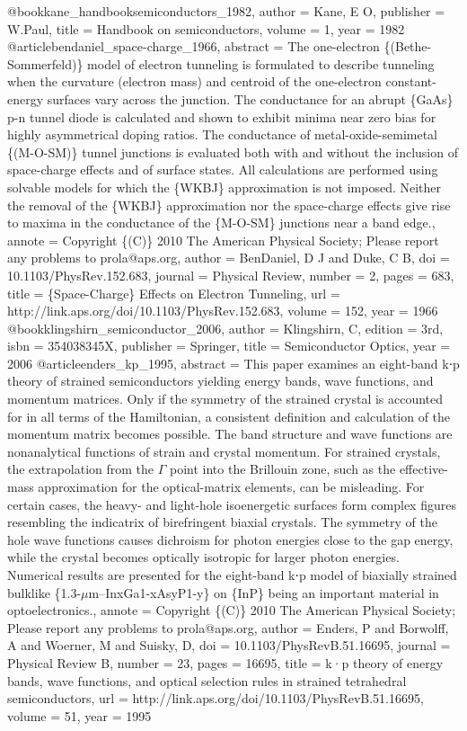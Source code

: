 @book{kane_handbooksemiconductors_1982,
author = {Kane, E O},
publisher = {W.Paul},
title = {{Handbook on semiconductors}},
volume = {1},
year = {1982}
}
@article{bendaniel_space-charge_1966,
abstract = {The one-electron \{(Bethe-Sommerfeld)\} model of electron tunneling is formulated to describe tunneling when the curvature (electron mass) and centroid of the one-electron constant-energy surfaces vary across the junction. The conductance for an abrupt \{GaAs\} p-n tunnel diode is calculated and shown to exhibit minima near zero bias for highly asymmetrical doping ratios. The conductance of metal-oxide-semimetal \{(M-O-SM)\} tunnel junctions is evaluated both with and without the inclusion of space-charge effects and of surface states. All calculations are performed using solvable models for which the \{WKBJ\} approximation is not imposed. Neither the removal of the \{WKBJ\} approximation nor the space-charge effects give rise to maxima in the conductance of the \{M-O-SM\} junctions near a band edge.},
annote = {Copyright \{(C)\} 2010 The American Physical Society; Please report any problems to prola@aps.org},
author = {BenDaniel, D J and Duke, C B},
doi = {10.1103/PhysRev.152.683},
journal = {Physical Review},
number = {2},
pages = {683},
title = {{\{Space-Charge\} Effects on Electron Tunneling}},
url = {http://link.aps.org/doi/10.1103/PhysRev.152.683},
volume = {152},
year = {1966}
}
@book{klingshirn_semiconductor_2006,
author = {Klingshirn, C},
edition = {3rd},
isbn = {354038345X},
publisher = {Springer},
title = {{Semiconductor Optics}},
year = {2006}
}
@article{enders_kp_1995,
abstract = {This paper examines an eight-band k⋅p theory of strained semiconductors yielding energy bands, wave functions, and momentum matrices. Only if the symmetry of the strained crystal is accounted for in all terms of the Hamiltonian, a consistent definition and calculation of the momentum matrix becomes possible. The band structure and wave functions are nonanalytical functions of strain and crystal momentum. For strained crystals, the extrapolation from the $\Gamma$ point into the Brillouin zone, such as the effective-mass approximation for the optical-matrix elements, can be misleading. For certain cases, the heavy- and light-hole isoenergetic surfaces form complex figures resembling the indicatrix of birefringent biaxial crystals. The symmetry of the hole wave functions causes dichroism for photon energies close to the gap energy, while the crystal becomes optically isotropic for larger photon energies. Numerical results are presented for the eight-band k⋅p model of biaxially strained bulklike \{1.3-$\mu$m–InxGa1-xAsyP1-y\} on \{InP\} being an important material in optoelectronics.},
annote = {Copyright \{(C)\} 2010 The American Physical Society; Please report any problems to prola@aps.org},
author = {Enders, P and Borwolff, A and Woerner, M and Suisky, D},
doi = {10.1103/PhysRevB.51.16695},
journal = {Physical Review B},
number = {23},
pages = {16695},
title = {k·p theory of energy bands, wave functions, and optical selection rules in strained tetrahedral semiconductors},
url = {http://link.aps.org/doi/10.1103/PhysRevB.51.16695},
volume = {51},
year = {1995}
}
